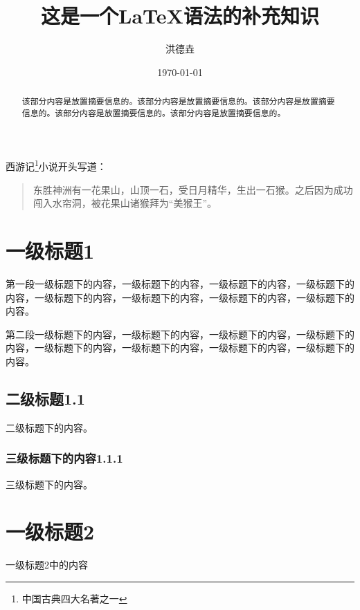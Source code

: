 \documentclass[UTF8]{article}
\title{这是一个\LaTeX{}语法的补充知识}
\author{洪德垚}
\date{\today}
\begin{document}
    \maketitle   %

    \renewcommand{\contentsname}{目录} %
    \tableofcontents

    \begin{abstract}
        该部分内容是放置摘要信息的。该部分内容是放置摘要信息的。该部分内容是放置摘要信息的。该部分内容是放置摘要信息的。该部分内容是放置摘要信息的。
    \end{abstract}

    西游记\footnote{中国古典四大名著之一}小说开头写道：
    \begin{quote}
    {\kaishu 东胜神洲有一花果山，山顶一石，受日月精华，生出一石猴。之后因为成功闯入水帘洞，被花果山诸猴拜为“美猴王”。}
    \end{quote}


    \section{一级标题1}
    第一段一级标题下的内容，一级标题下的内容，一级标题下的内容，一级标题下的内容，一级标题下的内容，一级标题下的内容，一级标题下的内容，一级标题下的内容。\par
    第二段一级标题下的内容，一级标题下的内容，一级标题下的内容，一级标题下的内容，一级标题下的内容，一级标题下的内容，一级标题下的内容，一级标题下的内容。

    \subsection{二级标题1.1}
    二级标题下的内容。

    \subsubsection{三级标题下的内容1.1.1}
    三级标题下的内容。

    \section{一级标题2}
    一级标题2中的内容
\end{document}
